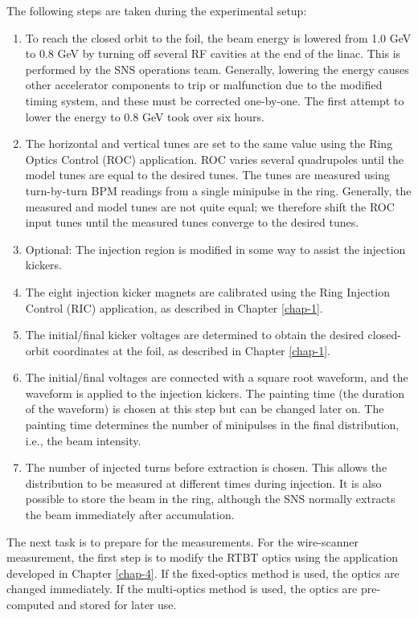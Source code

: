 The following steps are taken during the experimental setup:
%
\begin{enumerate}
    \item 
    To reach the closed orbit to the foil, the beam energy is lowered from 1.0 GeV to 0.8 GeV by turning off several RF cavities at the end of the linac. This is performed by the SNS operations team. Generally, lowering the energy causes other accelerator components to trip or malfunction due to the modified timing system, and these must be corrected one-by-one. The first attempt to lower the energy to 0.8 GeV took over six hours.
    \item
    The horizontal and vertical tunes are set to the same value using the Ring Optics Control (ROC) application. ROC varies several quadrupoles until the model tunes are equal to the desired tunes. The tunes are measured using turn-by-turn BPM readings from a single minipulse in the ring. Generally, the measured and model tunes are not quite equal; we therefore shift the ROC input tunes until the measured tunes converge to the desired tunes. 
    \item
    Optional: The injection region is modified in some way to assist the injection kickers.
    \item
    The eight injection kicker magnets are calibrated using the Ring Injection Control (RIC) application, as described in Chapter \ref{chap-1}. 
    \item
    The initial/final kicker voltages are determined to obtain the desired closed-orbit coordinates at the foil, as described in Chapter \ref{chap-1}.
    \item
    The initial/final voltages are connected with a square root waveform, and the waveform is applied to the injection kickers. The painting time (the duration of the waveform) is chosen at this step but can be changed later on. The painting time determines the number of minipulses in the final distribution, i.e., the beam intensity.
    \item
    The number of injected turns before extraction is chosen. This allows the distribution to be measured at different times during injection. It is also possible to store the beam in the ring, although the SNS normally extracts the beam immediately after accumulation.
\end{enumerate}
%
The next task is to prepare for the measurements. For the wire-scanner measurement, the first step is to modify the RTBT optics using the application developed in Chapter \ref{chap-4}. If the fixed-optics method is used, the optics are changed immediately. If the multi-optics method is used, the optics are pre-computed and stored for later use. 

